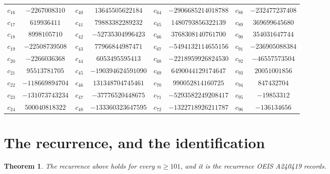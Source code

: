 \documentclass[11pt,a4paper]{article}
\theoremstyle{plain}
\newtheorem{theorem}{Theorem}
\theoremstyle{definition}
\begin{document}
\begin{center}
\begin{tabular}{cccccccc}
$c_{16}$ & $-2267008310$ & $c_{40}$ & $13645505622184$ & $c_{64}$ & $-2906685214018788$ & $c_{88}$ & $-232477237408$ \\
$c_{17}$ & $619936411$ & $c_{41}$ & $79883382289232$ & $c_{65}$ & $1480793856322139$ & $c_{89}$ & $369699645680$ \\
$c_{18}$ & $8998105710$ & $c_{42}$ & $-52735304996423$ & $c_{66}$ & $3768308140761700$ & $c_{90}$ & $354031647744$ \\
$c_{19}$ & $-22508739508$ & $c_{43}$ & $77966844987471$ & $c_{67}$ & $-5494132114655156$ & $c_{91}$ & $-236905088384$ \\
$c_{20}$ & $-2266036368$ & $c_{44}$ & $6053495595413$ & $c_{68}$ & $-2218959926824530$ & $c_{92}$ & $-46557573504$ \\
$c_{21}$ & $95513781705$ & $c_{45}$ & $-190394624591090$ & $c_{69}$ & $6490044129174647$ & $c_{93}$ & $20051001856$ \\
$c_{22}$ & $-118669894704$ & $c_{46}$ & $131348704745461$ & $c_{70}$ & $990052814160725$ & $c_{94}$ & $847432704$ \\
$c_{23}$ & $-131073743234$ & $c_{47}$ & $-37776520448675$ & $c_{71}$ & $-5293582249208417$ & $c_{95}$ & $-19853312$ \\
$c_{24}$ & $500040818322$ & $c_{48}$ & $-133360323647595$ & $c_{72}$ & $-1322718926211787$ & $c_{96}$ & $-136134656$ \\
\end{tabular}
\end{center}

\section{The recurrence, and the identification}

\begin{theorem}
The recurrence above holds for every $n\ge101$, and it is the recurrence OEIS A240419 records.
\end{theorem}
\end{document}
